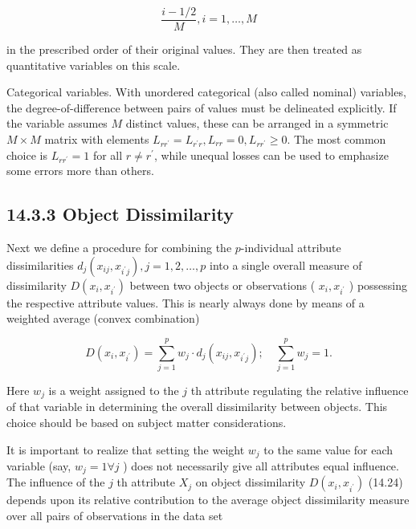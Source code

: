 \documentclass[10pt]{article}
\begin{document}
\begin{equation*}
\frac{i-1 / 2}{M}, i=1, \ldots, M \tag{14.23}
\end{equation*}


in the prescribed order of their original values. They are then treated as quantitative variables on this scale.

Categorical variables. With unordered categorical (also called nominal) variables, the degree-of-difference between pairs of values must be delineated explicitly. If the variable assumes $M$ distinct values, these can be arranged in a symmetric $M \times M$ matrix with elements $L_{r r^{\prime}}= L_{r^{\prime} r}, L_{r r}=0, L_{r r^{\prime}} \geq 0$. The most common choice is $L_{r r^{\prime}}=1$ for all $r \neq r^{\prime}$, while unequal losses can be used to emphasize some errors more than others.

\subsection*{14.3.3 Object Dissimilarity}
Next we define a procedure for combining the $p$-individual attribute dissimilarities $d_{j}\left(x_{i j}, x_{i^{\prime} j}\right), j=1,2, \ldots, p$ into a single overall measure of dissimilarity $D\left(x_{i}, x_{i^{\prime}}\right)$ between two objects or observations ( $x_{i}, x_{i^{\prime}}$ ) possessing the respective attribute values. This is nearly always done by means of a weighted average (convex combination)


\begin{equation*}
D\left(x_{i}, x_{i^{\prime}}\right)=\sum_{j=1}^{p} w_{j} \cdot d_{j}\left(x_{i j}, x_{i^{\prime} j}\right) ; \quad \sum_{j=1}^{p} w_{j}=1 . \tag{14.24}
\end{equation*}


Here $w_{j}$ is a weight assigned to the $j$ th attribute regulating the relative influence of that variable in determining the overall dissimilarity between objects. This choice should be based on subject matter considerations.

It is important to realize that setting the weight $w_{j}$ to the same value for each variable (say, $w_{j}=1 \forall j$ ) does not necessarily give all attributes equal influence. The influence of the $j$ th attribute $X_{j}$ on object dissimilarity $D\left(x_{i}, x_{i^{\prime}}\right)$ (14.24) depends upon its relative contribution to the average object dissimilarity measure over all pairs of observations in the data set
\end{document}
